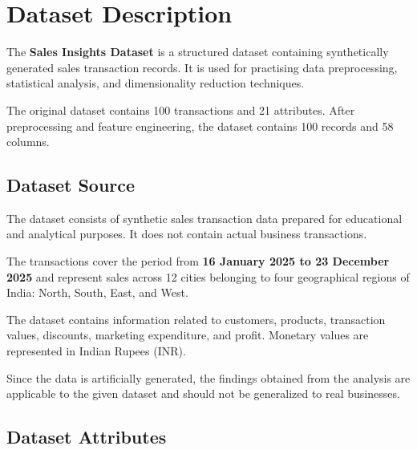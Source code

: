 \documentclass[12pt,a4paper]{report}
\begin{document}
\endgroup



\chapter{Dataset Description}

\begingroup
\fontsize{14}{21}\selectfont

The \textbf{Sales Insights Dataset} is a structured
dataset containing synthetically generated sales
transaction records. It is used for practising
data preprocessing, statistical analysis, and
dimensionality reduction techniques.

The original dataset contains 100 transactions
and 21 attributes. After preprocessing and
feature engineering, the dataset contains
100 records and 58 columns.


\section{Dataset Source}

The dataset consists of synthetic sales
transaction data prepared for educational
and analytical purposes. It does not contain
actual business transactions.

The transactions cover the period from
\textbf{16 January 2025 to 23 December 2025}
and represent sales across 12 cities
belonging to four geographical regions
of India: North, South, East, and West.

The dataset contains information related
to customers, products, transaction values,
discounts, marketing expenditure, and profit.
Monetary values are represented in
Indian Rupees (INR).

Since the data is artificially generated,
the findings obtained from the analysis
are applicable to the given dataset and
should not be generalized to real businesses.


\section{Dataset Attributes}
\end{document}
